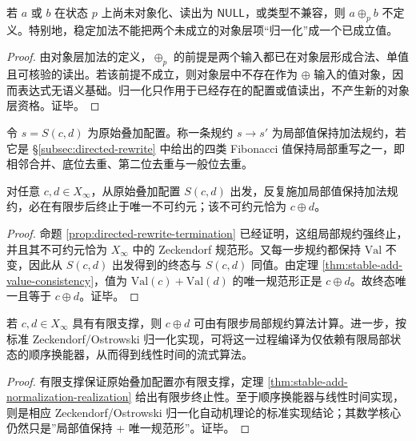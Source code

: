 \begin{proposition}\label{prop:stable-add-no-null-creation}
若 \(a\) 或 \(b\) 在状态 \(p\) 上尚未对象化、读出为 \(\mathsf{NULL}\)，或类型不兼容，则 \(a\oplus_p b\) 不定义。特别地，稳定加法不能把两个未成立的对象层项“归一化”成一个已成立值。
\end{proposition}
\begin{proof}
由对象层加法的定义，\(\oplus_p\) 的前提是两个输入都已在对象层形成合法、单值且可核验的读出。若该前提不成立，则对象层中不存在作为 \(\oplus\) 输入的值对象，因而表达式无语义基础。归一化只作用于已经存在的配置或值读出，不产生新的对象层资格。证毕。
\end{proof}

\begin{definition}[局部值保持加法规约]
令 \(s=S(c,d)\) 为原始叠加配置。称一条规约 \(s\to s'\) 为局部值保持加法规约，若它是 \S\ref{subsec:directed-rewrite} 中给出的四类 Fibonacci 值保持局部重写之一，即相邻合并、底位去重、第二位去重与一般位去重。
\end{definition}

\begin{theorem}[稳定加法的归一化实现]\label{thm:stable-add-normalization-realization}
对任意 \(c,d\in X_\infty\)，从原始叠加配置 \(S(c,d)\) 出发，反复施加局部值保持加法规约，必在有限步后终止于唯一不可约元；该不可约元恰为 \(c\oplus d\)。
\end{theorem}
\begin{proof}
命题 \ref{prop:directed-rewrite-termination} 已经证明，这组局部规约强终止，并且其不可约元恰为 \(X_\infty\) 中的 Zeckendorf 规范形。又每一步规约都保持 \(\mathrm{Val}\) 不变，因此从 \(S(c,d)\) 出发得到的终态与 \(S(c,d)\) 同值。由定理 \ref{thm:stable-add-value-consistency}，值为 \(\mathrm{Val}(c)+\mathrm{Val}(d)\) 的唯一规范形正是 \(c\oplus d\)。故终态唯一且等于 \(c\oplus d\)。证毕。
\end{proof}

\begin{corollary}[加法的可计算性]\label{cor:stable-add-computable}
若 \(c,d\in X_\infty\) 具有有限支撑，则 \(c\oplus d\) 可由有限步局部规约算法计算。进一步，按标准 Zeckendorf/Ostrowski 归一化实现，可将这一过程编译为仅依赖有限局部状态的顺序换能器，从而得到线性时间的流式算法。
\end{corollary}
\begin{proof}
有限支撑保证原始叠加配置亦有限支撑，定理 \ref{thm:stable-add-normalization-realization} 给出有限步终止性。至于顺序换能器与线性时间实现，则是相应 Zeckendorf/Ostrowski 归一化自动机理论的标准实现结论；其数学核心仍然只是”局部值保持 + 唯一规范形”。证毕。
\end{proof}

